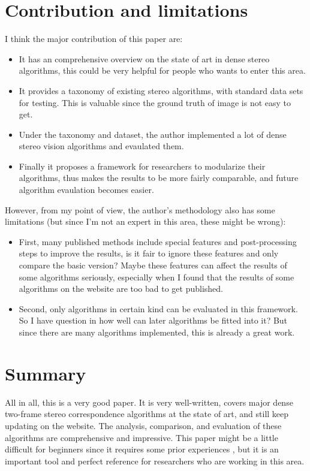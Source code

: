 \documentclass[10pt,twocolumn,letterpaper]{article}
\begin{document}
\section{Contribution and limitations}
I think the major contribution of this paper are:
\begin{itemize}
\item It has an comprehensive overview on the state 
of art in dense stereo algorithms, this could be very 
helpful for people who wants to enter this area.
\item It provides a taxonomy of existing stereo
algorithms, with standard data sets for testing. This is valuable since
the ground truth of image is not easy to get.
\item Under the taxonomy and dataset, the author implemented a lot of 
dense stereo vision algorithms and evaulated them.
\item Finally it proposes a framework for researchers 
to modularize their algorithms, thus makes the results to 
be more fairly comparable, and future algorithm evaulation becomes easier.
\end{itemize}

However, from my point of view, the author's methodology also has some limitations 
(but since I'm not an expert in this area, these might be wrong):
\begin{itemize}
\item First, many published methods include special features and post-processing
steps to improve the results, is it fair to ignore these features and only 
compare the basic version? Maybe these features can affect the results of some algorithms
seriously, especially when I found that the results of some algorithms on the website
are too bad to get published.
\item Second, only algorithms in certain kind can be evaluated in this framework. 
So I have question in how well can later algorithms be fitted into it? But since
there are many algorithms implemented, this is already a great work.
\end{itemize}
\section{Summary}
All in all, this is a very good paper. It is very well-written, covers major dense two-frame
stereo correspondence algorithms at the state of art, and still keep updating on the website. 
The analysis, comparison, and evaluation of these algorithms are comprehensive and impressive.
This paper might be a little difficult for beginners since it requires some prior experiences
, but it is an important tool and perfect reference for researchers who are working in this area.

\end{document}
